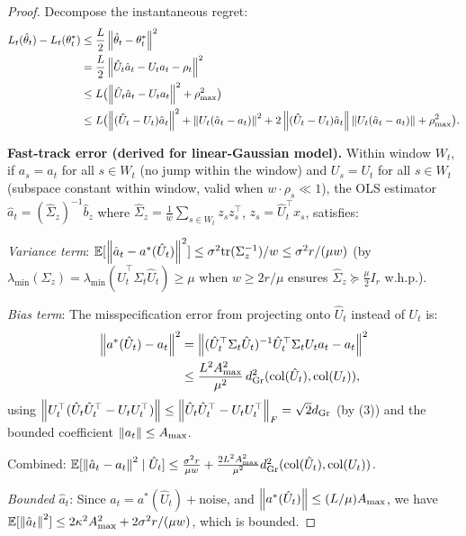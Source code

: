 \begin{proof}
Decompose the instantaneous regret:
\begin{align*}
  L_t(\hat{\theta}_t) - L_t(\theta^*_t)
  &\leq \frac{L}{2}\left\|\hat{\theta}_t - \theta^*_t\right\|^2 \\
  &= \frac{L}{2}\left\|\hat{U}_t \hat{a}_t - U_t a_t - \rho_t\right\|^2 \\
  &\leq L\bigl(\left\|\hat{U}_t \hat{a}_t - U_t a_t\right\|^2 + \rho_{\max}^2\bigr) \\
  &\leq L\bigl(\left\|(\hat{U}_t - U_t)\hat{a}_t\right\|^2
    + \left\|U_t(\hat{a}_t - a_t)\right\|^2
    + 2\left\|(\hat{U}_t-U_t)\hat{a}_t\right\|\left\|U_t(\hat{a}_t-a_t)\right\|
    + \rho_{\max}^2\bigr).
\end{align*}

\textbf{Fast-track error (derived for linear-Gaussian model).}
Within window $W_t$, if $a_s = a_t$ for all $s \in W_t$ (no jump within
the window) and $U_s = U_t$ for all $s \in W_t$ (subspace constant within
window, valid when $w \cdot \rho_s \ll 1$), the OLS estimator
$\hat{a}_t = (\hat\Sigma_z)^{-1}\hat{b}_z$ where
$\hat\Sigma_z = \frac{1}{w}\sum_{s \in W_t} z_s z_s^\top$,
$z_s = \hat{U}_t^\top x_s$, satisfies:

\emph{Variance term}: $\mathbb{E}[\left\|\hat{a}_t - a^*(\hat{U}_t)\right\|^2]
\leq \sigma^2 \mathrm{tr}(\Sigma_z^{-1})/w \leq \sigma^2 r/(\mu w)$
(by $\lambda_{\min}(\Sigma_z) = \lambda_{\min}(\hat{U}_t^\top\Sigma_t\hat{U}_t) \geq \mu$ when $w \geq 2r/\mu$ ensures
$\hat\Sigma_z \succeq \frac{\mu}{2}I_r$ w.h.p.).

\emph{Bias term}: The misspecification error from projecting onto
$\hat{U}_t$ instead of $U_t$ is:
\begin{align*}
  \left\|a^*(\hat{U}_t) - a_t\right\|^2
  &= \left\|(\hat{U}_t^\top\Sigma_t\hat{U}_t)^{-1}
    \hat{U}_t^\top\Sigma_t U_t a_t - a_t\right\|^2 \\
  &\leq \frac{L^2 A_{\max}^2}{\mu^2}\,
    d_{\mathrm{Gr}}^2(\mathrm{col}(\hat{U}_t), \mathrm{col}(U_t)),
\end{align*}
using $\left\|U_t^\top(\hat{U}_t\hat{U}_t^\top - U_tU_t^\top)\right\| \leq
\left\|\hat{U}_t\hat{U}_t^\top - U_tU_t^\top\right\|_F = \sqrt{2}d_{\mathrm{Gr}}$
(by (3)) and the bounded coefficient
$\left\|a_t\right\| \leq A_{\max}$.

Combined: $\mathbb{E}[\left\|\hat{a}_t - a_t\right\|^2 \mid \hat{U}_t]
\leq \frac{\sigma^2 r}{\mu w}
+ \frac{2L^2 A_{\max}^2}{\mu^2}d_{\mathrm{Gr}}^2(\mathrm{col}(\hat{U}_t), \mathrm{col}(U_t))$.

\emph{Bounded $\hat{a}_t$}: Since $\hat{a}_t = a^*(\hat{U}_t) +
\text{noise}$, and $\left\|a^*(\hat{U}_t)\right\| \leq (L/\mu)A_{\max}$,
we have $\mathbb{E}[\left\|\hat{a}_t\right\|^2] \leq 2\kappa^2 A_{\max}^2
+ 2\sigma^2 r/(\mu w)$, which is bounded.


\end{proof}
